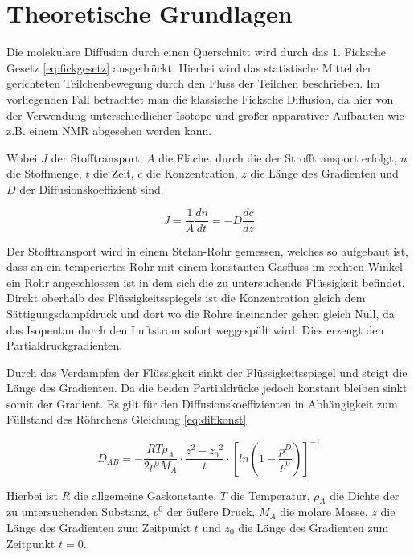 



\section{Theoretische Grundlagen}

Die molekulare Diffusion durch einen Querschnitt wird durch das $1.$ Ficksche Gesetz \ref{eq:fickgesetz} ausgedrückt. Hierbei wird das  statistische Mittel der gerichteten Teilchenbewegung durch den Fluss der Teilchen beschrieben. Im vorliegenden Fall betrachtet man die klassische Ficksche Diffusion, da hier von der Verwendung unterschiedlicher Isotope und großer apparativer Aufbauten wie z.B. einem NMR abgesehen werden kann.


 Wobei $J$ der Stofftransport, $A$ die Fläche, durch die der Strofftransport erfolgt, $n$ die Stoffmenge, $t$ die Zeit, $c$ die Konzentration, $z$ die Länge des Gradienten und $D$ der Diffusionskoeffizient sind.

\begin {equation}
J=\frac{1}{A}\frac{dn}{dt}=-D\frac{dc}{dz}
\label{eq:fickgesetz}
\end {equation}



Der Stofftransport wird in einem Stefan-Rohr gemessen, welches so aufgebaut ist, dass an ein temperiertes Rohr mit einem konstanten Gasfluss im rechten Winkel ein Rohr angeschlossen ist in dem sich die zu untersuchende Flüssigkeit befindet. Direkt oberhalb des Flüssigkeitsspiegels ist die Konzentration gleich dem Sättigungsdampfdruck und dort wo die Rohre ineinander gehen gleich Null, da das Isopentan durch den Luftstrom sofort weggespült wird. Dies erzeugt den Partialdruckgradienten.

Durch das Verdampfen der Flüssigkeit sinkt der Flüssigkeitsspiegel und steigt die Länge des Gradienten. Da die beiden Partialdrücke jedoch konstant bleiben sinkt somit der Gradient.  Es gilt für den Diffusionskoeffizienten in Abhängigkeit zum Füllstand des Röhrchens Gleichung \ref{eq:diffkonst}

\begin {equation}
D_{AB}=-\frac{RT\rho_A}{2p^0M_A}\cdot\frac{z^2-{z_0}^2}{t} \cdot\left[ln\left(1-\frac{p^D}{p^0}\right)\right]^{-1}
\label{eq:diffkonst}
\end{equation}

Hierbei ist $R$ die allgemeine Gaskonstante, $T$ die Temperatur, $\rho_A$ die Dichte der zu untersuchenden Substanz, $p^0$ der äußere Druck, $M_A$ die molare Masse, $z$ die Länge des Gradienten zum Zeitpunkt $t$ und $z_0$ die Länge des Gradienten zum Zeitpunkt $t=0$. 

